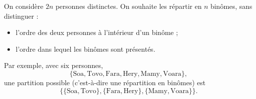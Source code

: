 On considère $2n$ personnes distinctes. On souhaite les répartir en $n$
binômes, sans distinguer :
\begin{itemize}
  \item l'ordre des deux personnes à l'intérieur d'un binôme ;
  \item l'ordre dans lequel les binômes sont présentés.
\end{itemize}
Par exemple, avec six personnes,
\[
\{\text{Soa}, \text{Tovo}, \text{Fara}, \text{Hery}, \text{Mamy}, \text{Voara}\},
\]
une partition possible (c'est-à-dire une répartition en binômes) est
\[
\{\{\text{Soa}, \text{Tovo}\}, \{\text{Fara}, \text{Hery}\}, \{\text{Mamy}, \text{Voara}\}\}.
\]

\begin{center}
\end{center}


